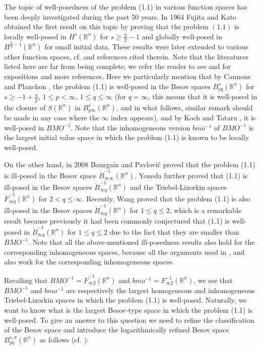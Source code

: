 \documentclass[11pt]{article}
\begin{document}
  The topic of well-posedness of the problem (1.1) in various function spaces has been deeply investigated during the past 50 years. In 1964 Fujita and
  Kato \cite{FUJK64} obtained the first result on this topic by proving that the problem $(1.1)$ is locally well-posed in $H^s(\mathbb{R}^n)$ for
  $s\geq\frac{n}{2}-1$ and globally well-posed in $H^{\frac{n}{2}-1}(\mathbb{R}^n)$ for small initial data. These results were later extended to various
  other function spaces, cf. \cite{BAR96, CAN97, FABJR72, GIG86, GM89, KAT84, KOCT01, LEM07, PLA96, TER99, WEI81} and references cited therein. Note
  that the literatures listed here are far from being complete; we refer the reader to see \cite{CAN04} and \cite{LEM02} for expositions and more
  references. Here we particularly mention that by Cannone \cite{CAN97} and Planchon \cite{PLA96}, the problem (1.1) is well-posed in the Besov spaces
  $B^{s}_{pq}(\mathbb{R}^n)$ for $s\geqslant-1+\frac{n}{p}$, $1\leqslant p<\infty$, $1\leqslant q\leqslant\infty$ (for $q=\infty$, this means that
  it is well-posed in the closure of $S(\mathbb{R}^n)$ in $B^{s}_{p\infty}(\mathbb{R}^n)$, and in what follows, similar remark should be made in
  any case where the $\infty$ index appears), and by Koch and Tataru \cite{KOCT01},
  it is well-posed in $BMO^{-1}$. Note that the inhomogeneous version $bmo^{-1}$ of $BMO^{-1}$ is the largest initial value space in which the problem
  (1.1) is known to be locally well-posed.

  On the other hand, in 2008 Bourgain and Pavlovi\'{c} \cite{BP08} proved that the problem (1.1) is ill-posed in the Besov space
  $\dot{B}^{-1}_{\infty\infty}(\mathbb{R}^n)$. Yoneda \cite{Yon10} further proved that (1.1) is ill-posed in the Besov spaces
  $\dot{B}^{-1}_{\infty q}(\mathbb{R}^n)$ and the Triebel-Lizorkin spaces $\dot{F}^{-1}_{\infty q}(\mathbb{R}^n)$ for $2<q\leqslant\infty$. Recently,
  Wang \cite{Wang} proved that the problem (1.1) is also ill-posed in the Besov spaces $\dot{B}^{-1}_{\infty q}(\mathbb{R}^n)$ for $1\leqslant
  q\leqslant 2$, which is a remarkable result because previously it had been commonly conjectured that (1.1) is well-posed in
  $\dot{B}^{-1}_{\infty q}(\mathbb{R}^n)$ for $1\leqslant q\leqslant 2$ due to the fact that they are smaller than $BMO^{-1}$. Note that all the
  above-mentioned ill-posedness results also hold for the corresponding inhomogeneous spaces, because all the arguments used in \cite{BP08},
  \cite{Yon10} and \cite{Wang} also work for the corresponding inhomogeneous spaces.

  Recalling that $BMO^{-1}=\dot{F}^{-1}_{\infty 2}(\mathbb{R}^n)$ and $bmo^{-1}=F^{-1}_{\infty 2}(\mathbb{R}^n)$, we see that  $BMO^{-1}$ and $bmo^{-1}$
  are respectively the largest homogeneous and inhomogeneous Triebel-Lizorkin spaces in which the problem (1.1) is well-posed. Naturally, we want to
  know what is the largest Besov-type space in which the problem (1.1) is well-posed. To give an answer to this question we need to refine the
  classification of the Besov space and introduce the logarithmically refined Besov space $B^{s,\sigma}_{pq}(\mathbb{R}^n)$ as
  follows (cf. \cite{Yon10}):
\medskip
\end{document}
